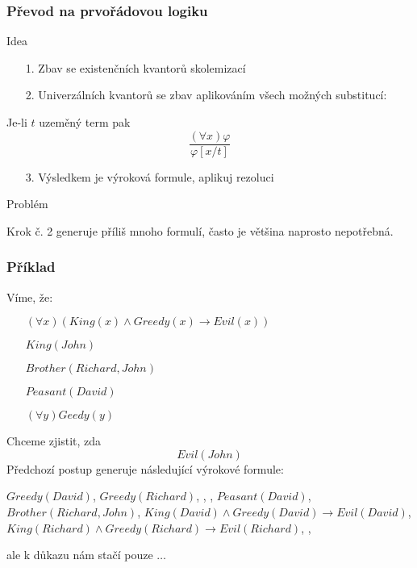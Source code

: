 \documentclass[red,professionalfont]{beamer}
\theoremstyle{definition}
\newcommand{\0}{\mbox{${\bf 0}$}}
\begin{document}
\begin{frame}\frametitle{Převod na prvořádovou logiku}
\begin{block}{}
 \begin{center}
  Idea
 \end{center}
\end{block}\pause
\begin{itemize}
 \item[1.] Zbav se existenčních kvantorů skolemizací\pause
 \item[2.] Univerzálních kvantorů se zbav aplikováním všech možných substitucí:
\end{itemize}\pause
Je-li $t$ uzeměný term pak\pause
\begin{displaymath}
  \frac{(\forall x)\varphi}{\varphi[x/t]}
\end{displaymath}\pause
\begin{itemize}
 \item[3.] Výsledkem je výroková formule, aplikuj rezoluci
\end{itemize}\pause
\begin{block}{}
 \begin{center}
  Problém
 \end{center}
\end{block}\pause
Krok č. 2 generuje příliš mnoho formulí, často je většina naprosto nepotřebná.
\end{frame}
\begin{frame}\frametitle{Příklad}
Víme, že:\pause
\begin{itemize}
 \item[] $(\forall x)(King(x)\wedge Greedy(x)\rightarrow Evil(x))$\pause
 \item[] $King(John)$\pause
 \item[] $Brother(Richard,John)$\pause
 \item[] $Peasant(David)$\pause
 \item[] $(\forall y)Geedy(y)$\pause
\end{itemize}
Chceme zjistit, zda\pause
\begin{displaymath}
 Evil(John)
\end{displaymath}\pause
Předchozí postup generuje následující výrokové formule:\pause
\begin{center}
 $Greedy(David)$\pause, 
 $Greedy(Richard)$\pause, 
 \pause, 
 \pause,
 $Peasant(David)$\pause,
 $Brother(Richard,John)$\pause,
 $King(David)\wedge Greedy(David) \rightarrow Evil(David)$\pause,
 $King(Richard)\wedge Greedy(Richard) \rightarrow Evil(Richard)$\pause,
 ,\pause
\end{center}
ale k důkazu nám stačí pouze  $\ldots$
\end{frame}
\end{document}
